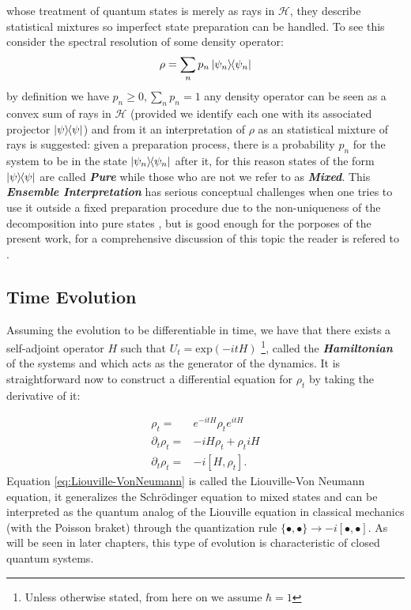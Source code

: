 whose treatment of quantum states is merely as rays in $\mathcal{H}$, they describe statistical mixtures so imperfect state preparation
can be handled. To see this consider the spectral resolution of some density operator:
\begin{equation}
  \rho = \sum_{n}p_{n}\ketbra{\psi_{n}}
\end{equation}
by definition we have $p_{n}\geq 0, \sum_{n}p_{n}=1$  any density operator can be seen as a convex sum of rays in $\mathcal{H}$ (provided we
identify each one with its associated projector $\ketbra{\psi}$) and from it an  interpretation of $\rho$ as an statistical mixture of rays is
suggested: given a preparation process, there is a probability $p_{n}$ for the system to be in the state $\ketbra{\psi_{n}}$ after it, for this
reason states of the form $\ketbra{\psi}$ are called \textbf{\textit{Pure}} while those who are not we refer to as \textbf{\textit{Mixed}}.
This \textbf{\textit{Ensemble Interpretation}} has serious conceptual challenges when one tries to use it outside a
fixed preparation procedure due to the non-uniqueness of the decomposition into pure states \cite{nielsen_quantum_2010},
but is good enough for the porposes of the present work, for a comprehensive discussion of this
topic the reader is refered to \cite{schlosshauer_decoherence_2007}.
\subsection{Time Evolution}
Assuming the evolution to be differentiable in time, we have that there exists a self-adjoint operator $H$ such that $U_{t} = \mathrm{exp}(-itH)$
\footnote{Unless otherwise stated, from here on we assume $\hbar=1$}, called the \textbf{\textit{Hamiltonian}} of the systems and which
acts as the generator of the dynamics. It is straightforward now to construct a differential equation for $\rho_{t}$ by taking the derivative
of it:

\begin{align}
  \rho_{t}=& e^{-itH}\rho_{t}  e^{itH}\\
  \partial_{t}\rho_{t} =& -iH\rho_{t} + \rho_{t}iH\\
  \partial_{t}\rho_{t} =& -i[H, \rho_{t}]\label{eq:Liouville-VonNeumann}.
\end{align}
Equation \eqref{eq:Liouville-VonNeumann} is called the Liouville-Von Neumann equation, it generalizes the  Schr\"{o}dinger equation
to mixed states and can be interpreted as the quantum analog of the Liouville equation in classical mechanics (with the Poisson braket) through
the quantization rule $\{\bullet,\bullet\} \to -i[\bullet,\bullet]$. As will be seen in later chapters, this type of evolution is characteristic
of closed quantum systems.
